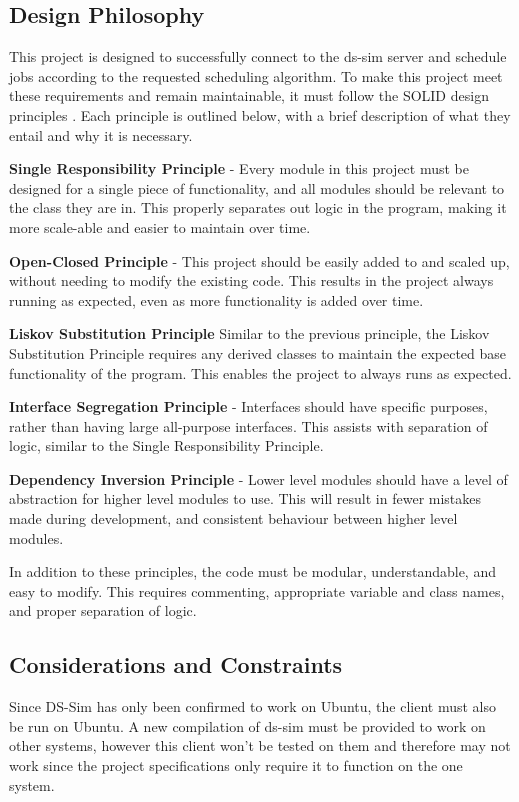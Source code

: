 \subsection{Design Philosophy}
This project is designed to successfully connect to the ds-sim server and schedule jobs according to the requested scheduling algorithm. To make this project meet these requirements and remain maintainable, it must follow the SOLID design principles \cite{solid}. Each principle is outlined below, with a brief description of what they entail and why it is necessary.

\begin{labeling}{}
    \item[\textbf{Single Responsibility Principle}] - Every module in this project must be designed for a single piece of functionality, and all modules should be relevant to the class they are in. This properly separates out logic in the program, making it more scale-able and easier to maintain over time.
    \item[\textbf{Open-Closed Principle}] - This project should be easily added to and scaled up, without needing to modify the existing code. This results in the project always running as expected, even as more functionality is added over time.
    \item[\textbf{Liskov Substitution Principle}] Similar to the previous principle, the Liskov Substitution Principle requires any derived classes to maintain the expected base functionality of the program. This enables the project to always runs as expected.
    \item[\textbf{Interface Segregation Principle}] - Interfaces should have specific purposes, rather than having large all-purpose interfaces. This assists with separation of logic, similar to the Single Responsibility Principle.
    \item[\textbf{Dependency Inversion Principle}] - Lower level modules should have a level of abstraction for higher level modules to use. This will result in fewer mistakes made during development, and consistent behaviour between higher level modules.
\end{labeling}

In addition to these principles, the code must be modular, understandable, and easy to modify. This requires commenting, appropriate variable and class names, and proper separation of logic.


\subsection{Considerations and Constraints}
Since DS-Sim has only been confirmed to work on Ubuntu, the client must also be run on Ubuntu. A new compilation of ds-sim must be provided to work on other systems, however this client won't be tested on them and therefore may not work since the project specifications only require it to function on the one system. \\

